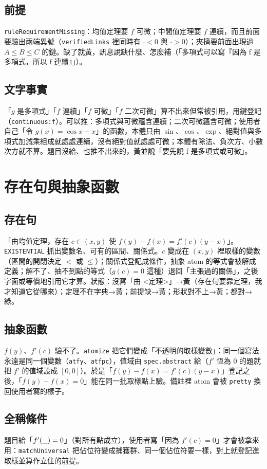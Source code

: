 \documentclass[11pt,a4paper,oneside]{book}
\renewcommand{\_}{\ifmmode\origunderscore\else\textunderscore\allowbreak\fi}
\newcommand{\code}[1]{\texttt{#1}}
\begin{document}
\section{前提}
\code{ruleRequirementMissing}：均值定理要 $f$ 可微；中間值定理要 $f$ 連續，而且前面要驗出兩端異號（\code{verifiedLinks} 裡同時有 $\cdot < 0$ 與 $\cdot > 0$）；夾擠要前面出現過 $A \le B \le C$ 的鏈。缺了就黃，訊息說缺什麼、怎麼補（「多項式可以寫『因為 f 是多項式，所以 f 連續』」）。

\section{文字事實}
「$g$ 是多項式」「$f$ 連續」「$f$ 可微」「$f$ 二次可微」算不出來但常被引用，用鍵登記（\code{continuous:f}）。可以推：多項式與可微蘊含連續；二次可微蘊含可微；使用者自己「令 $g(x) = \cos x - x$」的函數，本體只由 $\sin$、$\cos$、$\exp$、絕對值與多項式加減乘組成就處處連續，沒有絕對值就處處可微；本體有除法、負次方、小數次方就不算。題目沒給、也推不出來的，黃並說「要先說 f 是多項式或可微」。

\chapter{存在句與抽象函數}
\section{存在句}
「由均值定理，存在 $c \in (x, y)$ 使 $f(y) - f(x) = f'(c)(y-x)$」。\code{EXISTENTIAL} 抓出變數名、可有的區間、關係式。$c$ 變成在 $(x, y)$ 裡取樣的變數（區間的開閉決定 $<$ 或 $\le$）；關係式登記成條件，抽象 atom 的等式會被解成定義；解不了、抽不到點的等式（$g(c) = 0$ 這種）退回「主張過的關係」，之後字面或等價地引用它才算。狀態：沒寫「由 <定理>」→黃（存在句要靠定理，我才知道它從哪來）；定理不在字典→黃；前提缺→黃；形狀對不上→黃；都對→綠。

\section{抽象函數}
$f(y)$、$f'(c)$ 驗不了。\code{atomize} 把它們變成「不透明的取樣變數」：同一個寫法永遠是同一個變數（\code{at\_f\_y}、\code{at\_fp\_c}），值域由 \code{spec.abstract} 給（$f'$ 恆為 0 的題就把 $f'$ 的值域設成 $[0,0]$）。於是「$f(y) - f(x) = f'(c)(y-x)$」登記之後，「$f(y) - f(x) = 0$」能在同一批取樣點上驗。備註裡 atom 會被 \code{pretty} 換回使用者寫的樣子。

\section{全稱條件}
題目給「$f'(\_) = 0$」（對所有點成立），使用者寫「因為 $f'(c) = 0$」才會被拿來用：\code{matchUniversal} 把佔位符變成捕獲群、同一個佔位符要一樣，對上就登記進取樣並算作立住的前提。
\end{document}
